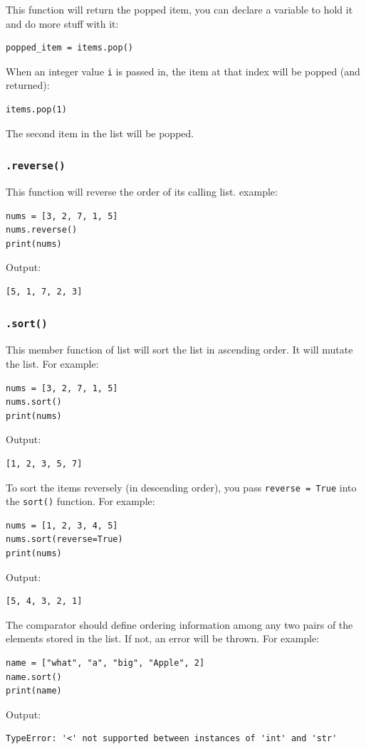 \documentclass[12pt]{book}
\begin{document}
This function will return the popped item, you can declare a variable to hold it and do more stuff with it:
\begin{verbatim}
popped_item = items.pop()
\end{verbatim}

When an integer value \texttt{i} is passed in, the item at that index will be popped (and returned):
\begin{verbatim}
items.pop(1)
\end{verbatim}
The second item in the list will be popped.
\subsubsection{\texttt{.reverse()}}
\label{sec:org6d66b20}
This function will reverse the order of its calling list. example:
\begin{verbatim}
nums = [3, 2, 7, 1, 5]
nums.reverse()
print(nums)
\end{verbatim}
Output:
\begin{verbatim}
[5, 1, 7, 2, 3]
\end{verbatim}
\subsubsection{\texttt{.sort()}}
\label{sec:org624a131}
This member function of list will sort the list in ascending order. It will mutate the list. For example:
\begin{verbatim}
nums = [3, 2, 7, 1, 5]
nums.sort()
print(nums)
\end{verbatim}
Output:
\begin{verbatim}
[1, 2, 3, 5, 7]
\end{verbatim}

To sort the items reversely (in descending order), you pass \texttt{reverse = True} into the \texttt{sort()} function. For example:
\begin{verbatim}
nums = [1, 2, 3, 4, 5]
nums.sort(reverse=True)
print(nums)
\end{verbatim}
Output:
\begin{verbatim}
[5, 4, 3, 2, 1]
\end{verbatim}

The comparator should define ordering information among any two pairs of the elements stored in the list. If not, an error will be thrown. For example:
\begin{verbatim}
name = ["what", "a", "big", "Apple", 2]
name.sort()
print(name)
\end{verbatim}
Output:
\begin{verbatim}
TypeError: '<' not supported between instances of 'int' and 'str'
\end{verbatim}
\end{document}
